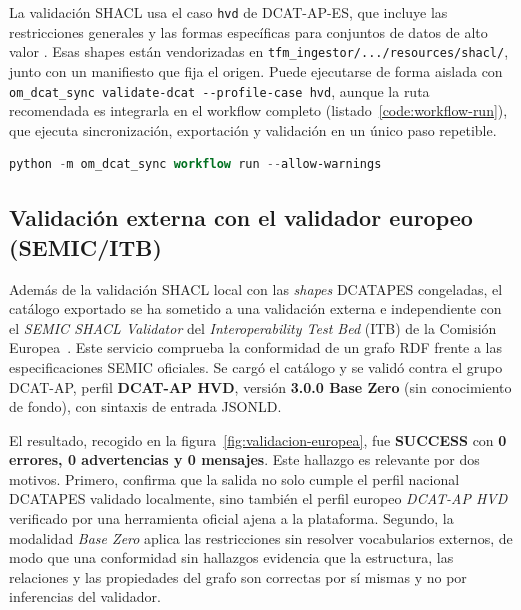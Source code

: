 La validación SHACL usa el caso \texttt{hvd} de DCAT-AP-ES, que incluye las restricciones generales y las formas específicas para conjuntos de datos de alto valor \cite{datosGobValidacionDcatApEs2025}. Esas shapes están vendorizadas en \texttt{tfm\_ingestor/.../resources/shacl/}, junto con un manifiesto que fija el origen. Puede ejecutarse de forma aislada con \texttt{om\_dcat\_sync validate-dcat -{}-profile-case hvd}, aunque la ruta recomendada es integrarla en el workflow completo (listado~\ref{code:workflow-run}), que ejecuta sincronización, exportación y validación en un único paso repetible.

\begin{lstlisting}[language=PowerShell, caption={\emph{Workflow} canónico de extremo a extremo: sincroniza gobierno, exporta DCAT-AP-ES y valida SHACL HVD.}, label=code:workflow-run, captionpos=b]
python -m om_dcat_sync workflow run --allow-warnings
\end{lstlisting}

\subsection{Validación externa con el validador europeo (SEMIC/ITB)}\label{sec:validacion-europea}

Además de la validación \ac{SHACL} local con las \emph{shapes} \ac{DCATAPES} congeladas, el catálogo exportado se ha sometido a una validación externa e independiente con el \emph{SEMIC SHACL Validator} del \emph{Interoperability Test Bed} (ITB) de la Comisión Europea~\cite{itbSemicShacl}. Este servicio comprueba la conformidad de un grafo \ac{RDF} frente a las especificaciones SEMIC oficiales. Se cargó el catálogo  y se validó contra el grupo DCAT-AP, perfil \textbf{DCAT-AP HVD}, versión \textbf{3.0.0 Base Zero} (sin conocimiento de fondo), con sintaxis de entrada \ac{JSONLD}.

El resultado, recogido en la figura~\ref{fig:validacion-europea}, fue \textbf{SUCCESS} con \textbf{0 errores, 0 advertencias y 0 mensajes}. Este hallazgo es relevante por dos motivos. Primero, confirma que la salida no solo cumple el perfil nacional \ac{DCATAPES} validado localmente, sino también el perfil europeo \emph{DCAT-AP HVD} verificado por una herramienta oficial ajena a la plataforma. Segundo, la modalidad \emph{Base Zero} aplica las restricciones sin resolver vocabularios externos, de modo que una conformidad sin hallazgos evidencia que la estructura, las relaciones y las propiedades del grafo son correctas por sí mismas y no por inferencias del validador.

